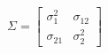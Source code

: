 

\[
\Sigma = \left[ \begin{array}{cc} \sigma_1^2 & \sigma_{12} \\ \sigma_{21} & \sigma_2^2 \end{array} \right]
\]


